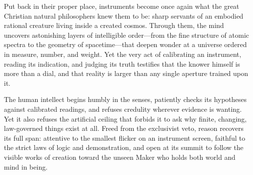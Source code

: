 Put back in their proper place, instruments become once again what the great Christian natural philosophers knew them to be: sharp servants of an embodied rational creature living inside a created cosmos. Through them, the mind uncovers astonishing layers of intelligible order---from the fine structure of atomic spectra to the geometry of spacetime---that deepen wonder at a universe ordered in measure, number, and weight. Yet the very act of calibrating an instrument, reading its indication, and judging its truth testifies that the knower himself is more than a dial, and that reality is larger than any single aperture trained upon it.

The human intellect begins humbly in the senses, patiently checks its hypotheses against calibrated readings, and refuses credulity wherever evidence is wanting. Yet it also refuses the artificial ceiling that forbids it to ask why finite, changing, law-governed things exist at all. Freed from the exclusivist veto, reason recovers its full span: attentive to the smallest flicker on an instrument screen, faithful to the strict laws of logic and demonstration, and open at its summit to follow the visible works of creation toward the unseen Maker who holds both world and mind in being.
